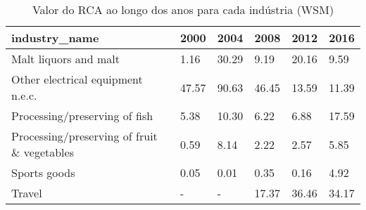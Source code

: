 \begin{table}
\centering
\caption{Valor do RCA ao longo dos anos para cada indústria (WSM)}
\begin{tabular}{p{6cm}p{1.5cm}p{1.5cm}p{1.5cm}p{1.5cm}p{1.5cm}}
\toprule
                              industry\_name &  2000 &  2004 &  2008 &  2012 &  2016 \\
\midrule
                      Malt liquors and malt &  1.16 & 30.29 &  9.19 & 20.16 &  9.59 \\
          Other electrical equipment n.e.c. & 47.57 & 90.63 & 46.45 & 13.59 & 11.39 \\
              Processing/preserving of fish &  5.38 & 10.30 &  6.22 &  6.88 & 17.59 \\
Processing/preserving of fruit \& vegetables &  0.59 &  8.14 &  2.22 &  2.57 &  5.85 \\
                               Sports goods &  0.05 &  0.01 &  0.35 &  0.16 &  4.92 \\
                                     Travel &     - &     - & 17.37 & 36.46 & 34.17 \\
\bottomrule
\end{tabular}
\end{table}
